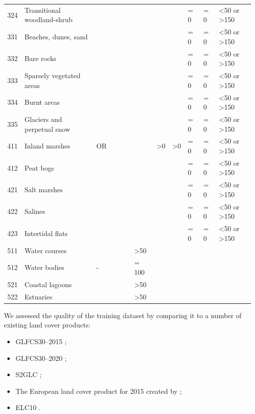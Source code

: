 \begin{table}[!hbt]
{\begin{tabular}{@{}lll|llllll|lll@{}}
    324 & Transitional woodland-shrub &  &  &  &  &  &  &  & = 0 & = 0 & \textless{}50 or \textgreater 150 \\
    331 & Beaches, dunes, sand &  &  &  &  &  &  &  & = 0 & = 0 & \textless{}50 or \textgreater 150 \\
    332 & Bare rocks &  &  &  &  &  &  &  & = 0 & = 0 & \textless{}50 or \textgreater 150 \\
    333 & Sparsely vegetated areas &  &  &  &  &  &  &  & = 0 & = 0 & \textless{}50 or \textgreater 150 \\
    334 & Burnt areas &  &  &  &  &  &  &  & = 0 & = 0 & \textless{}50 or \textgreater 150 \\
    335 & Glaciers and perpetual snow &  &  &  &  &  &  &  & = 0 & = 0 & \textless{}50 or \textgreater 150 \\
    411 & Inland marshes & OR &  &  &  &  & \textgreater{}0 & \textgreater{}0 & = 0 & = 0 & \textless{}50 or \textgreater 150 \\
    412 & Peat bogs &  &  &  &  &  &  &  & = 0 & = 0 & \textless{}50 or \textgreater 150 \\
    421 & Salt marshes &  &  &  &  &  &  &  & = 0 & = 0 & \textless{}50 or \textgreater 150 \\
    422 & Salines &  &  &  &  &  &  &  & = 0 & = 0 & \textless{}50 or \textgreater 150 \\
    423 & Intertidal flats &  &  &  &  &  &  &  & = 0 & = 0 & \textless{}50 or \textgreater 150 \\
    511 & Water courses &  &  &  &  & \textgreater{}50 &  &  &  &  &  \\
    512 & Water bodies & - &  &  &  & = 100 &  &  &  &  &  \\
    521 & Coastal lagoons &  &  &  &  & \textgreater{}50 &  &  &  &  &  \\
    522 & Estuaries &  &  &  &  & \textgreater{}50 &  &  &  &  &  \\ \bottomrule
    \end{tabular}%
    }
    \end{table}

    We assessed the quality of the training dataset by comparing it to a number of existing land cover products:
        
    \begin{itemize}
    \item GLFCS30--2015 \citep{zhang2020glcfcs30};
    \item GLFCS30--2020 \citep{zhang2020glcfcs30};
    \item S2GLC \citep{malinowski2020};
    \item The European land cover product for 2015 created by \citet{pflugmacher2019mapping};
    \item  ELC10 \citep{venter2021continentalscale}.
    \end{itemize}
    
